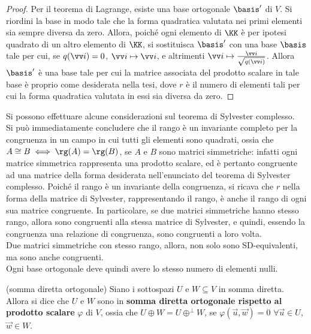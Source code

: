 \documentclass[11pt]{article}
\begin{document}
	\begin{proof}
		Per il teorema di Lagrange, esiste una base ortogonale $\basis'$ di $V$.
		Si riordini la base in modo tale che la forma quadratica valutata nei primi elementi sia sempre diversa da zero. Allora, poiché ogni
		elemento di $\KK$ è per ipotesi quadrato di un altro elemento
		di $\KK$, si sostituisca $\basis'$ con una base $\basis$ tale per
		cui, se $q(\vv i) = 0$, $\vv i \mapsto \vv i$, e altrimenti
		$\vv i \mapsto \frac{\vv i}{\sqrt{q(\vv i)}}$. Allora $\basis'$
		è una base tale per cui la matrice associata del prodotto scalare
		in tale base è proprio come desiderata nella tesi, dove $r$ è
		il numero di elementi tali per cui la forma quadratica valutata
		in essi sia diversa da zero.
	\end{proof}

	\begin{remark}
		Si possono effettuare alcune considerazioni sul teorema di Sylvester
		complesso. \\
		
		\li Si può immediatamente concludere che il rango è un invariante
		completo per la congruenza in un campo in cui tutti gli elementi
		sono quadrati, ossia che $A \cong B \iff \rg(A) = \rg(B)$, se $A$ e
		$B$ sono matrici simmetriche: infatti
		ogni matrice simmetrica rappresenta una prodotto scalare, ed è
		pertanto congruente ad una matrice della forma desiderata
		nell'enunciato del teorema di Sylvester complesso. Poiché il rango
		è un invariante della congruenza, si ricava che $r$ nella forma
		della matrice di Sylvester, rappresentando il rango, è anche
		il rango di ogni sua matrice congruente. In particolare, se due
		matrici simmetriche hanno stesso rango, allora sono congruenti
		alla stessa matrice di Sylvester, e quindi, essendo la congruenza
		una relazione di congruenza, sono congruenti a loro volta. \\
		\li Due matrici simmetriche con stesso rango, allora, non solo
		sono SD-equivalenti, ma sono anche congruenti. \\
		\li Ogni base ortogonale deve quindi avere lo stesso numero
		di elementi nulli.
	\end{remark}

	\begin{definition} (somma diretta ortogonale)
		Siano i sottospazi $U$ e $W \subseteq V$ in somma diretta. Allora si dice che $U$ e $W$ sono in \textbf{somma
		diretta ortogonale rispetto al prodotto scalare} $\varphi$ di $V$, ossia che $U \oplus W = U \oplus^\perp W$, se $\varphi(\vec u, \vec w) = 0$ $\forall \vec u \in U$, $\vec w \in W$.
	\end{definition}
\end{document}
